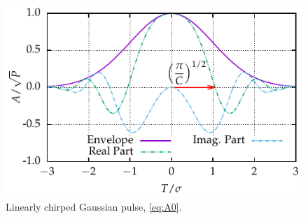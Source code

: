 \documentclass[9pt,twocolumn,twoside]{osajnl}
\begin{document}
\begin{figure}[tbp]
	\centering
	\includegraphics{Figures/Sample_Gauss}
	\caption{Linearly chirped Gaussian pulse, \eqref{eq:A0}.}
	\label{fig:samplegauss}
\end{figure}
\end{document}
